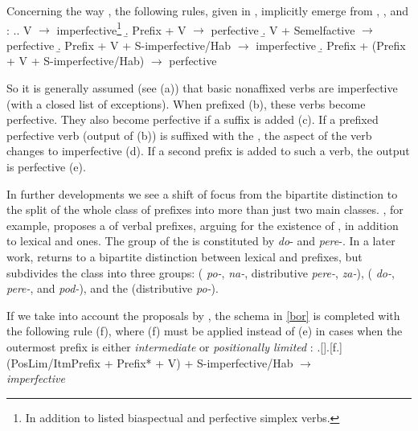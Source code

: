 Concerning the way , the following rules, given in \cite{Borer:13}, implicitly emerge from \citet{Ramchand:04}, \citet{Romanova:04}, and \citet{Svenonius:04b}:
\ex.\label{bor}\a. V $\rightarrow$ {imperfective}\footnote{In addition to listed biaspectual and perfective simplex verbs.}
\b. Prefix + V $\rightarrow$ {perfective}
\b. V + Semelfactive $\rightarrow$ {perfective}
\b. Prefix + V + S-imperfective/Hab $\rightarrow$ {imperfective}
\b. Prefix + (Prefix + V + S-imperfective/Hab) $\rightarrow$ {perfective}

So it is generally assumed (see (a)) that basic nonaffixed verbs are imperfective (with a closed list of exceptions). When prefixed (b), these verbs become perfective. They also become perfective if a  suffix is added (c). If a prefixed perfective verb (output of (b)) is suffixed with the , the aspect of the verb changes to imperfective (d). If a second prefix is added to such a verb, the output is perfective (e).

In further developments we see a shift of focus from the bipartite distinction to the split of the whole class of prefixes into more than just two main classes. \citet{Tatevosov:07}, for example, proposes a  of verbal prefixes, arguing for the existence of , in addition to lexical and  ones. The group of the  is constituted by  \textit{do}- and  \textit{pere}-. In a later work, \citet{Tatevosov:09} returns to a bipartite distinction between lexical and  prefixes, but subdivides the  class into three groups:  ( \textit{po-},  \textit{na-}, distributive \textit{pere-},  \textit{za-}),  ( \textit{do-},  \textit{pere-}, and  \textit{pod-}), and the  (distributive \textit{po-}).

If we take into account the proposals by \citet{Tatevosov:07, Tatevosov:09}, the schema in \ref{bor} is completed with the following rule (f), where (f) must be applied instead of (e) in cases when the outermost prefix is either \textit{intermediate} \citep{Tatevosov:07} or \textit{positionally limited} \citep{Tatevosov:09}: 
\ex.[]\a.[f.] (PosLim/ItmPrefix + Prefix* + V) + S-imperfective/Hab $\rightarrow$\\ \textit{imperfective} 

